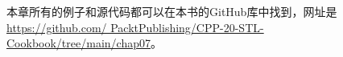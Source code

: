 



本章所有的例子和源代码都可以在本书的GitHub库中找到，网址是\url{https://github.com/	PacktPublishing/CPP-20-STL-Cookbook/tree/main/chap07}。